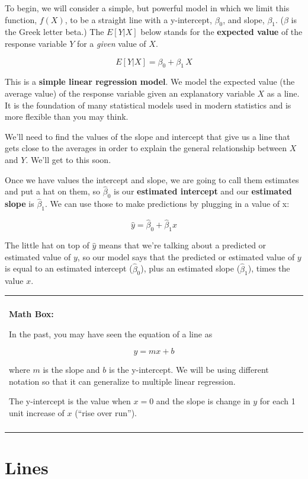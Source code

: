 \documentclass[
]{book}
\newenvironment{mathbox}
{
    \begin{center}
    
    \begin{tabular}{|p{0.8\textwidth}|}
    \rowcolor{LightYellow}
    \hline\\
    \rowcolor{LightYellow}
    \textbf{Math Box:}
}
{
    \\\rowcolor{LightYellow}
    \\\hline
    \end{tabular} 
    \end{center}
}
\begin{document}
To begin, we will consider a simple, but powerful model in which we limit this function, \(f(X)\), to be a straight line with a y-intercept, \(\beta_0\), and slope, \(\beta_1\). (\(\beta\) is the Greek letter beta.) The \(E[Y | X]\) below stands for the \textbf{expected value} of the response variable \(Y\) for a \emph{given} value of \(X\).

\[E[Y | X] = \beta_0 + \beta_1\,X\]

This is a \textbf{simple linear regression model}. We model the expected value (the average value) of the response variable given an explanatory variable \(X\) as a line. It is the foundation of many statistical models used in modern statistics and is more flexible than you may think.

We'll need to find the values of the slope and intercept that give us a line that gets close to the averages in order to explain the general relationship between \(X\) and \(Y\). We'll get to this soon.

Once we have values the intercept and slope, we are going to call them estimates and put a hat on them, so \(\hat{\beta}_0\) is our \textbf{estimated intercept} and our \textbf{estimated slope} is \(\hat{\beta}_1\). We can use those to make predictions by plugging in a value of x:

\[\hat{y} = \hat{\beta}_0 +\hat{\beta}_1 x\]

The little hat on top of \(\hat{y}\) means that we're talking about a predicted or estimated value of \(y\), so our model says that the predicted or estimated value of \(y\) is equal to an estimated intercept (\(\hat{\beta}_0\)), plus an estimated slope (\(\hat{\beta}_1\)), times the value \(x\).

\begin{mathbox}
In the past, you may have seen the equation of a line as

\[y = mx + b\]

where \(m\) is the slope and \(b\) is the y-intercept. We will be using
different notation so that it can generalize to multiple linear
regression.

The y-intercept is the value when \(x=0\) and the slope is change in
\(y\) for each 1 unit increase of \(x\) (``rise over run'').
\end{mathbox}

\hypertarget{lines}{%
\section{Lines}\label{lines}}
\end{document}
